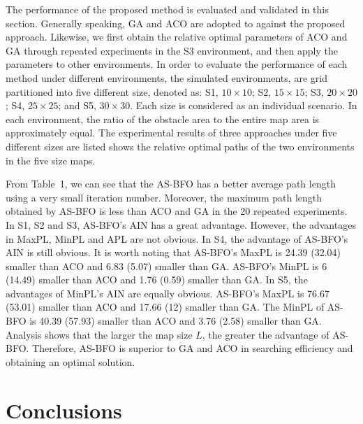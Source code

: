 \documentclass{PDS}%
\theoremstyle{definition}
\begin{document}
The performance of the proposed method is evaluated and validated in this section. Generally
speaking, GA and ACO are adopted to against the proposed approach. Likewise, we first
obtain the relative optimal parameters of ACO and GA through repeated experiments in the
S3 environment, and then apply the parameters to other environments. In order to
evaluate the performance of each method under different environments, the simulated
environments, are grid partitioned into five different
size, denoted as: S1, $10\times 10$; S2, $15\times 15$; S3, $20\times 20$; S4, $25\times 25$; and S5, $30\times 30$. Each size is considered as an individual scenario. In each
environment, the ratio of the obstacle area to the entire map area is approximately
equal. The experimental results of three approaches under five different sizes are listed shows the relative optimal paths of the
two environments in the five size maps.

From Table~1, we can see that the AS-BFO has a better average path
length using a very small iteration number. Moreover, the maximum path length obtained by
AS-BFO is less than ACO and GA in the 20 repeated experiments. In S1, S2 and S3,
AS-BFO's AIN has a great advantage. However, the advantages in MaxPL, MinPL and APL are
not obvious. In S4, the advantage of AS-BFO's AIN is still obvious. It is worth noting
that AS-BFO's MaxPL is 24{.}39 (32{.}04) smaller than ACO and 6{.}83 (5{.}07) smaller than GA.
AS-BFO's MinPL is 6 (14{.}49) smaller than ACO and 1{.}76 (0{.}59) smaller than GA. In S5, the
advantages of MinPL's AIN are equally obvious. AS-BFO's MaxPL is 76{.}67 (53{.}01) smaller
than ACO and 17{.}66 (12) smaller than GA. The MinPL of AS-BFO is 40{.}39 (57{.}93) smaller
than ACO and 3{.}76 (2{.}58) smaller than GA. Analysis shows that the larger the map size $L$,
the greater the advantage of AS-BFO. Therefore, AS-BFO is superior to GA and ACO in
searching efficiency and obtaining an optimal solution.

\section{Conclusions}\label{sec5}
\end{document}
